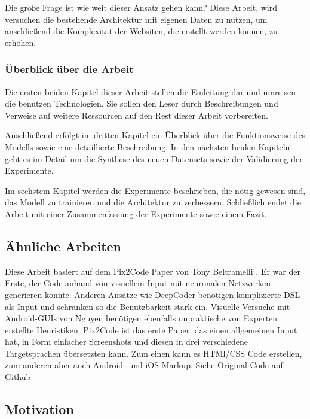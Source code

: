 \documentclass[pdftex,a4paper,halfparskip, article]{scrartcl}
\begin{document}
Die große Frage ist wie weit dieser Ansatz gehen kann? Diese Arbeit, wird versuchen die bestehende Architektur mit eigenen Daten zu nutzen, um anschließend die Komplexität der Websiten, die erstellt werden können, zu erhöhen.

\subsubsection*{Überblick über die Arbeit}

Die ersten beiden Kapitel dieser Arbeit stellen die Einleitung dar und umreisen die benutzen Technologien. Sie sollen den Leser durch Beschreibungen und Verweise auf weitere Ressourcen auf den Rest dieser Arbeit vorbereiten.

Anschließend erfolgt im dritten Kapitel ein Überblick über die Funktionsweise des Modells sowie eine detaillierte Beschreibung. In den nächsten beiden Kapiteln geht es im Detail um die Synthese des neuen Datensets sowie der Validierung der Experimente. 

Im sechstem Kapitel werden die Experimente beschrieben, die nötig gewesen sind, das Modell zu trainieren und die Architektur zu verbessern. Schließlich endet die Arbeit mit einer Zusammenfassung der Experimente sowie einem Fazit.

\subsection{Ähnliche Arbeiten}

Diese Arbeit basiert auf dem Pix2Code Paper von Tony Beltramelli \cite{Beltramelli17}. Er war der Erste, der Code anhand von visuellem Input mit neuronalen Netzwerken generieren konnte. 
Anderen Ansätze wie DeepCoder \cite{DeepCoder16} benötigen komplizierte DSL als Input und schränken so die Benutzbarkeit stark ein. Visuelle Versuche mit Android-GUIs von Nguyen \cite{Nguyen15} benötigen ebenfalls unpraktische von Experten erstellte Heuristiken. Pix2Code ist das erste Paper, das einen allgemeinen Input hat, in  Form einfacher Screenshots und diesen in drei verschiedene Targetsprachen übersetzten kann. Zum einen kann es HTMl/CSS Code erstellen, zum anderen aber auch Android- und iOS-Markup. Siehe Original Code auf Github \cite{Beltramelli17Github}

\subsection{Motivation}
\end{document}
